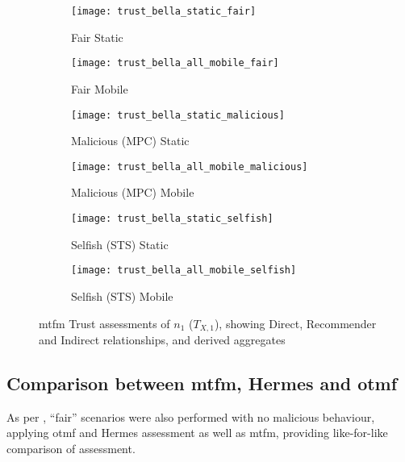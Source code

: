 \begin{figure}[h]
	\centering
	\begin{subfigure}{0.5\textwidth}
		\caption{Fair Static}
		\texttt{[image: trust\_bella\_static\_fair]} 
		\label{fig:trust_static}
	\end{subfigure}%
	\begin{subfigure}{0.5\textwidth}
		\caption{Fair Mobile}
		\texttt{[image: trust\_bella\_all\_mobile\_fair]}  
		\label{fig:trust_all_mobile}
	\end{subfigure}%
	
	\begin{subfigure}{0.5\textwidth}
		\caption{Malicious (MPC) Static}
		\texttt{[image: trust\_bella\_static\_malicious]} 
		\label{fig:trust_static_mal}
	\end{subfigure}%
	\begin{subfigure}{0.5\textwidth}
		\caption{Malicious (MPC) Mobile}
		\texttt{[image: trust\_bella\_all\_mobile\_malicious]}  
		\label{fig:trust_all_mobile_mal}
	\end{subfigure}%
	
	\begin{subfigure}{0.5\textwidth}
		\caption{Selfish (STS) Static}
		\texttt{[image: trust\_bella\_static\_selfish]}
		\label{fig:trust_static_sel}
	\end{subfigure}%
	\begin{subfigure}{0.5\textwidth}
		\caption{Selfish (STS) Mobile}
		\texttt{[image: trust\_bella\_all\_mobile\_selfish]}  \label{fig:trust_all_mobile_sel}
	\end{subfigure}%
	
	\caption{\gls{mtfm} Trust assessments of $n_1$ ($T_{X,1}$), showing Direct, Recommender and Indirect relationships, and derived aggregates} 
	\label{fig:trust_mobility}
\end{figure}
%

\subsection{Comparison between \gls{mtfm}, Hermes and \gls{otmf}}
As per \citet{Guo11}, ``fair'' scenarios were also performed with no malicious behaviour, applying \gls{otmf} and Hermes assessment as well as \gls{mtfm}, providing like-for-like comparison of assessment.

